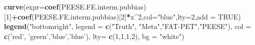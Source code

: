 \documentclass[]{book}
\newenvironment{Shaded}{\begin{snugshade}}{\end{snugshade}}
\newcommand{\DataTypeTok}[1]{\textcolor[rgb]{0.13,0.29,0.53}{#1}}
\newcommand{\DecValTok}[1]{\textcolor[rgb]{0.00,0.00,0.81}{#1}}
\newcommand{\KeywordTok}[1]{\textcolor[rgb]{0.13,0.29,0.53}{\textbf{#1}}}
\newcommand{\NormalTok}[1]{#1}
\newcommand{\OperatorTok}[1]{\textcolor[rgb]{0.81,0.36,0.00}{\textbf{#1}}}
\newcommand{\OtherTok}[1]{\textcolor[rgb]{0.56,0.35,0.01}{#1}}
\newcommand{\StringTok}[1]{\textcolor[rgb]{0.31,0.60,0.02}{#1}}
\theoremstyle{definition}
\theoremstyle{definition}
\theoremstyle{definition}
\theoremstyle{remark}
\begin{document}
\begin{Shaded}
\begin{Highlighting}[]
\KeywordTok{curve}\NormalTok{(}\DataTypeTok{expr=}\KeywordTok{coef}\NormalTok{(PEESE.FE.interm.pubbias)[}\DecValTok{1}\NormalTok{]}\OperatorTok{+}\KeywordTok{coef}\NormalTok{(PEESE.FE.interm.pubbias)[}\DecValTok{2}\NormalTok{]}\OperatorTok{*}\NormalTok{x}\OperatorTok{^}\DecValTok{2}\NormalTok{,}\DataTypeTok{col=}\StringTok{"blue"}\NormalTok{,}\DataTypeTok{lty=}\DecValTok{2}\NormalTok{,}\DataTypeTok{add =} \OtherTok{TRUE}\NormalTok{)}
\KeywordTok{legend}\NormalTok{(}\StringTok{"bottomright"}\NormalTok{,}
       \DataTypeTok{legend =} \KeywordTok{c}\NormalTok{(}\StringTok{"Truth"}\NormalTok{, }\StringTok{"Meta"}\NormalTok{,}\StringTok{"FAT-PET"}\NormalTok{,}\StringTok{"PEESE"}\NormalTok{),}
       \DataTypeTok{col =} \KeywordTok{c}\NormalTok{(}\StringTok{'red'}\NormalTok{, }\StringTok{'green'}\NormalTok{,}\StringTok{'blue'}\NormalTok{,}\StringTok{'blue'}\NormalTok{),}
       \DataTypeTok{lty=} \KeywordTok{c}\NormalTok{(}\DecValTok{1}\NormalTok{,}\DecValTok{1}\NormalTok{,}\DecValTok{1}\NormalTok{,}\DecValTok{2}\NormalTok{),}
       \DataTypeTok{bg =} \StringTok{"white"}\NormalTok{)}


\end{Highlighting}
\end{Shaded}
\end{document}

